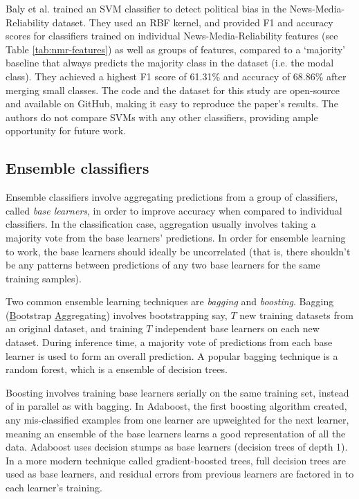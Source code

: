 Baly et al. \cite{baly-emnlp18} trained an SVM classifier to detect political bias in the News-Media-Reliability dataset. They used an RBF kernel, and provided F1 and accuracy scores for classifiers trained on individual News-Media-Reliability features (see Table \ref{tab:nmr-features}) as well as groups of features, compared to a `majority' baseline that always predicts the majority class in the dataset (i.e. the modal class). They achieved a highest F1 score of 61.31\% and accuracy of 68.86\% after merging small classes. The code and the dataset for this study are open-source and available on GitHub, making it easy to reproduce the paper's results. The authors do not compare SVMs with any other classifiers, providing ample opportunity for future work.

\subsection{Ensemble classifiers} \label{subsec:ensemble-classifiers}

Ensemble classifiers involve aggregating predictions from a group of classifiers, called \textit{base learners}, in order to improve accuracy when compared to individual classifiers. In the classification case, aggregation usually involves taking a majority vote from the base learners' predictions. In order for ensemble learning to work, the base learners should ideally be uncorrelated (that is, there shouldn't be any patterns between predictions of any two base learners for the same training samples).

Two common ensemble learning techniques are \textit{bagging} and \textit{boosting}. Bagging (\underline{B}ootstrap \underline{Agg}regating) involves bootstrapping say, $ T $ new training datasets from an original dataset, and training $ T $ independent base learners on each new dataset. During inference time, a majority vote of predictions from each base learner is used to form an overall prediction. A popular bagging technique is a random forest, which is a ensemble of decision trees.

Boosting involves training base learners serially on the same training set, instead of in parallel as with bagging. In Adaboost, the first boosting algorithm created, any mis-classified examples from one learner are upweighted for the next learner, meaning an ensemble of the base learners learns a good representation of all the data. Adaboost uses decision stumps as base learners (decision trees of depth 1). In a more modern technique called gradient-boosted trees, full decision trees are used as base learners, and residual errors from previous learners are factored in to each learner's training.

